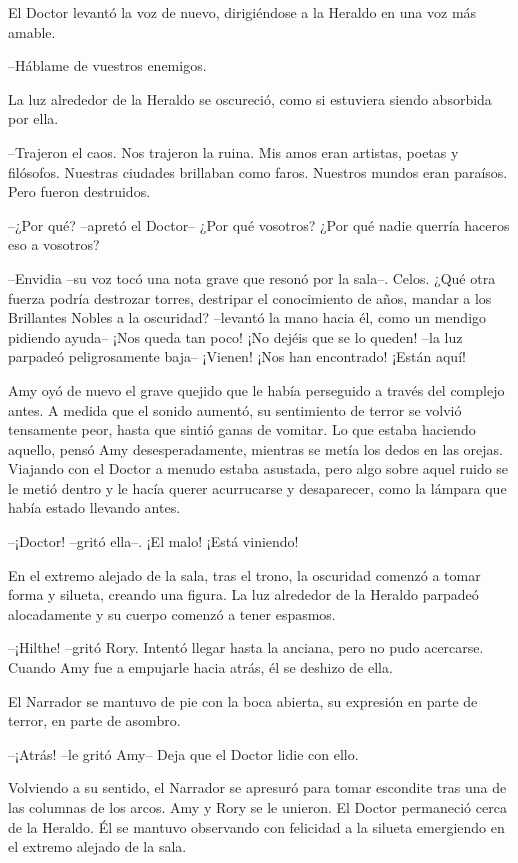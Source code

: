 {El Doctor levantó la voz de nuevo, dirigiéndose a la Heraldo en una voz
más amable.}

{--Háblame de vuestros enemigos.}

{La luz alrededor de la Heraldo se oscureció, como si estuviera siendo
absorbida por ella.}

{--Trajeron el caos. Nos trajeron la ruina. Mis amos eran artistas,
	poetas y filósofos. Nuestras ciudades brillaban como faros. Nuestros
mundos eran paraísos. Pero fueron destruidos.}

{--¿Por qué? --apretó el Doctor-- ¿Por qué vosotros? ¿Por qué nadie
querría haceros eso a vosotros?}

{--Envidia --su voz tocó una nota grave que resonó por la sala--.
	Celos. ¿Qué otra fuerza podría destrozar torres, destripar el
	conocimiento de años, mandar a los Brillantes Nobles a la oscuridad?
	--levantó la mano hacia él, como un mendigo pidiendo ayuda-- ¡Nos queda
	tan poco! ¡No dejéis que se lo queden! --la luz parpadeó peligrosamente
baja-- ¡Vienen! ¡Nos han encontrado! ¡Están aquí!}

{Amy oyó de nuevo el grave quejido que le había perseguido a través del
	complejo antes. A medida que el sonido aumentó, su sentimiento de terror
	se volvió tensamente peor, hasta que sintió ganas de vomitar. Lo que
	estaba haciendo aquello, pensó Amy desesperadamente, mientras se metía
	los dedos en las orejas. Viajando con el Doctor a menudo estaba
	asustada, pero algo sobre aquel ruido se le metió dentro y le hacía
	querer acurrucarse y desaparecer, como la lámpara que había estado
llevando antes.}

{--¡Doctor! --gritó ella--. ¡El malo! ¡Está viniendo!}

{En el extremo alejado de la sala, tras el trono, la oscuridad comenzó a
	tomar forma y silueta, creando una figura. La luz alrededor de la
Heraldo parpadeó alocadamente y su cuerpo comenzó a tener espasmos.}

{--¡Hilthe! --gritó Rory. Intentó llegar hasta la anciana, pero no
	pudo acercarse. Cuando Amy fue a empujarle hacia atrás, él se deshizo de
ella.}

{El Narrador se mantuvo de pie con la boca abierta, su expresión en
parte de terror, en parte de asombro.}

{--¡Atrás! --le gritó Amy-- Deja que el Doctor lidie con ello.}

{Volviendo a su sentido, el Narrador se apresuró para tomar escondite
	tras una de las columnas de los arcos. Amy y Rory se le unieron. El
	Doctor permaneció cerca de la Heraldo. Él se mantuvo observando con
felicidad a la silueta emergiendo en el extremo alejado de la sala.}

